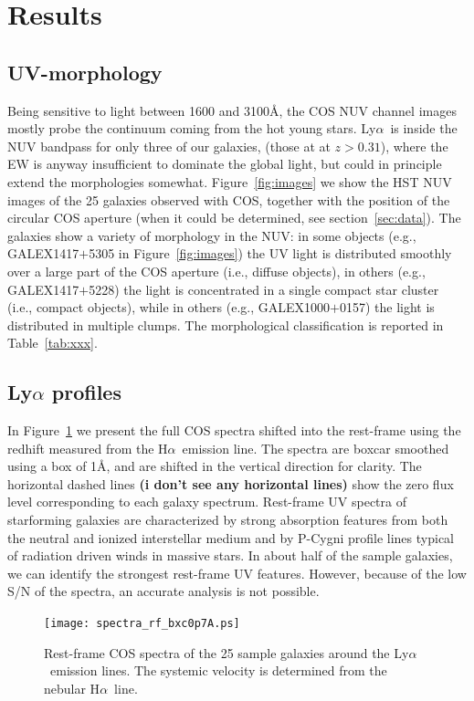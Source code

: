 \documentclass[manuscript]{emulateapj}
\newcommand{\lya}{Ly$\alpha$}
\newcommand{\ha}{H$\alpha$}
\begin{document}
\section{Results}

\subsection{UV-morphology}
Being sensitive to light between 1600 and 3100\AA, the COS NUV channel
images mostly probe the continuum coming from the hot young stars.
\lya\ is inside the NUV bandpass for only three of our galaxies, (those 
at at $z>0.31$), where the EW is anyway insufficient to dominate the 
global light, but could in principle extend the morphologies somewhat.
Figure~\ref{fig:images} we show the HST NUV
images of the 25 galaxies observed with COS, together with the
position of the circular COS aperture (when it could be determined,
see section~\ref{sec:data}). The galaxies show a variety of morphology
in the NUV: in some objects (e.g., GALEX1417$+$5305 in
Figure~\ref{fig:images}) the UV light is distributed smoothly over a
large part of the COS aperture (i.e., diffuse objects), in others
(e.g., GALEX1417$+$5228) the light is concentrated in a single compact
star cluster (i.e., compact objects), while in others (e.g.,
GALEX1000$+$0157) the light is distributed in multiple clumps.  The
morphological classification is reported in Table~\ref{tab:xxx}.

\subsection{Ly$\alpha$ profiles}


In Figure~\ref{fig:spectra_full} we present the full COS spectra
shifted into the rest-frame using the redhift measured from the \ha\
emission line. The spectra are boxcar smoothed using a box of 1\AA,
and are shifted in the vertical direction for clarity.  The horizontal
dashed lines \textbf{(i don't see any horizontal lines)} show the zero flux level corresponding to each galaxy
spectrum. Rest-frame UV spectra of starforming galaxies are
characterized by strong absorption features from both the neutral and
ionized interstellar medium and by P-Cygni profile lines typical of
radiation driven winds in massive stars. In about half of the sample
galaxies, we can identify the strongest rest-frame UV features.
However, because of the low S/N of the spectra, an accurate analysis
is not possible.

\begin{figure}[h!]
   \centering
   \texttt{[image: spectra\_rf\_bxc0p7A.ps]}
   \caption{Rest-frame COS spectra of the 25 sample galaxies around the \lya\
     emission lines. The systemic velocity is determined from the
     nebular \ha\ line. }
   \label{fig:spectra_full}
\end{figure}
\end{document}
